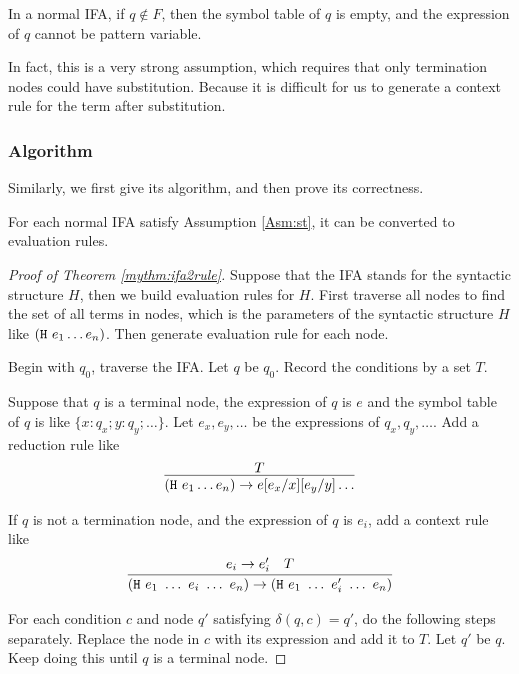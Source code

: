 \begin{Asm}
\label{Asm:st} 
In a normal IFA, if $q \notin F$, then the symbol table of $q$ is empty, and the expression of $q$ cannot be pattern variable.
\end{Asm}

In fact, this is a very strong assumption, which requires that only termination nodes could have substitution. Because it is difficult for us to generate a context rule for the term after substitution.

\subsubsection{Algorithm}

Similarly, we first give its algorithm, and then prove its correctness.

\begin{mythm}
\label{mythm:ifa2rule}
For each normal IFA satisfy Assumption \ref{Asm:st}, it can be converted to evaluation rules.
\end{mythm}

\begin{proof}[Proof of Theorem \ref{mythm:ifa2rule}]

Suppose that the IFA stands for the syntactic structure $H$, then we build evaluation rules for $H$. First traverse all nodes to find the set of all terms in nodes, which is the parameters of the syntactic structure $H$ like $(\mbox{\tt H}~e_1 \ldots e_n)$. Then generate evaluation rule for each node.

Begin with $q_0$, traverse the IFA. Let $q$ be $q_0$. Record the conditions by a set $T$.

Suppose that $q$ is a terminal node, the expression of $q$ is $e$ and the symbol table of $q$ is like $\{x:q_x; y:q_y; \ldots\}$. Let $e_x,e_y,\ldots$ be the expressions of $q_x, q_y, \ldots$. Add a reduction rule like
\[
\infer{(\m{H}~e_1 \ldots e_n) \to e[e_x/x][e_y/y]\ldots}{T}
\]

If $q$ is not a termination node, and the expression of $q$ is $e_i$, add a context rule like
\[
\infer{(\m{H}~e_1~\ldots~e_i~\ldots~e_n) \to (\m{H}~e_1~\ldots~e_i'~\ldots~e_n)}{e_i \to e_i' \quad T}
\]


For each condition $c$ and node $q'$ satisfying $\delta(q, c)=q'$, do the following steps separately. Replace the node in $c$ with its expression and add it to $T$. Let $q'$ be $q$. Keep doing this until $q$ is a terminal node.

\end{proof}

